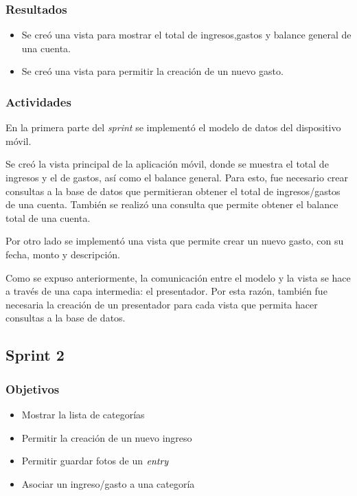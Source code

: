 \subsubsection{Resultados}
\begin{itemize}
\item Se creó una vista para mostrar el total de ingresos,gastos y balance general de una cuenta.
\item Se creó una vista para permitir la creación de un nuevo gasto.
\end{itemize}

\subsubsection{Actividades}
En la primera parte del \textit{sprint} se implementó el modelo de datos del dispositivo móvil.

Se creó la vista principal de la aplicación móvil, donde se muestra el total de ingresos y el de gastos, así como el balance general. Para esto, fue necesario crear consultas a la base de datos que permitieran obtener el total de ingresos/gastos de una cuenta.  También se realizó una consulta que permite obtener el balance total de una cuenta.

Por otro lado se implementó una vista que permite crear un nuevo gasto, con su fecha, monto y descripción.

Como se expuso anteriormente, la comunicación entre el modelo y la vista se hace a través de una capa intermedia: el presentador. Por esta razón, también fue necesaria la creación de un presentador para cada vista que permita hacer consultas a la base de datos.

\subsection{Sprint 2}

\subsubsection{Objetivos}
\begin{itemize}
\item Mostrar la lista de categorías
\item Permitir la creación de un nuevo ingreso
\item Permitir guardar fotos de un $\textit{entry}$
\item Asociar un ingreso/gasto a una categoría
\end{itemize}

